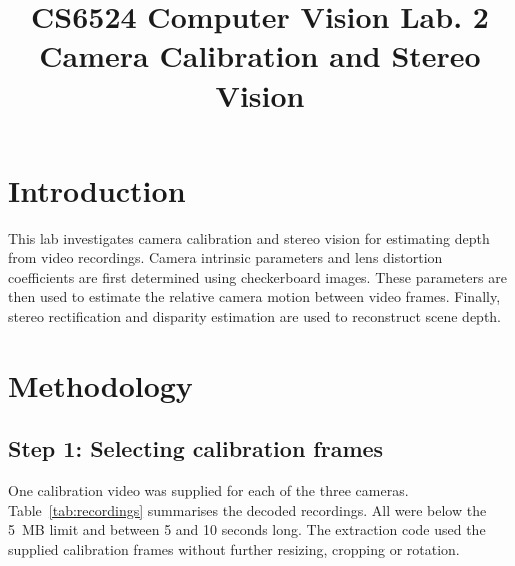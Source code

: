 \documentclass[conference]{IEEEtran}
\begin{document}
\title{CS6524 Computer Vision Lab. 2\\ Camera Calibration and Stereo Vision}

\author{
\and
{}
\and
{}
}

\maketitle

\section{Introduction}
This lab investigates camera calibration and stereo vision for estimating depth from video recordings. Camera intrinsic parameters and lens distortion coefficients are first determined using checkerboard images. These parameters are then used to estimate the relative camera motion between video frames. Finally, stereo rectification and disparity estimation are used to reconstruct scene depth.

\section{Methodology}
\subsection{Step 1: Selecting calibration frames}
One calibration video was supplied for each of the three cameras. Table~\ref{tab:recordings} summarises the decoded recordings. All were below the 5~MB limit and between 5 and 10 seconds long. The extraction code used the supplied calibration frames without further resizing, cropping or rotation.
\end{document}
